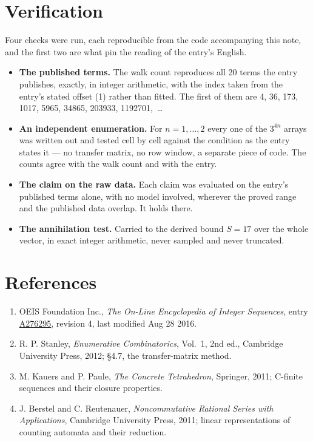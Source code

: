 \documentclass[11pt]{article}
\theoremstyle{definition}
\begin{document}
\section{Verification}

Four checks were run, each reproducible from the code accompanying this note, and the first two are what pin the reading of the entry's English.

\begin{itemize}

\item {\bfseries The published terms.} The walk count reproduces all 20 terms the entry publishes, exactly, in integer arithmetic, with the index taken from the entry's stated offset (1) rather than fitted. The first of them are 4, 36, 173, 1017, 5965, 34865, 203933, 1192701,~\dots

\item {\bfseries An independent enumeration.} For $n = 1,\dots,2$ every one of the $3^{4n}$ arrays was written out and tested cell by cell against the condition as the entry states it --- no transfer matrix, no row window, a separate piece of code. The counts agree with the walk count and with the entry.

\item {\bfseries The claim on the raw data.} Each claim was evaluated on the entry's published terms alone, with no model involved, wherever the proved range and the published data overlap. It holds there.

\item {\bfseries The annihilation test.} Carried to the derived bound $S = 17$ over the whole vector, in exact integer arithmetic, never sampled and never truncated.

\end{itemize}

\section{References}

\begin{enumerate}

\item OEIS Foundation Inc., \emph{The On-Line Encyclopedia of Integer Sequences}, entry \href{https://oeis.org/A276295}{A276295}, revision 4, last modified Aug 28 2016.

\item R. P. Stanley, \emph{Enumerative Combinatorics}, Vol.~1, 2nd ed., Cambridge University Press, 2012; \S4.7, the transfer-matrix method.

\item M. Kauers and P. Paule, \emph{The Concrete Tetrahedron}, Springer, 2011; C-finite sequences and their closure properties.

\item J. Berstel and C. Reutenauer, \emph{Noncommutative Rational Series with Applications}, Cambridge University Press, 2011; linear representations of counting automata and their reduction.

\end{enumerate}
\end{document}
